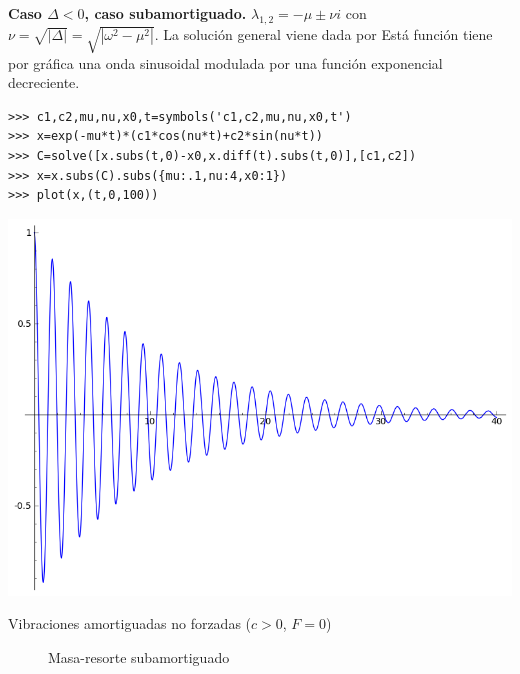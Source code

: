 \noindent\textbf{Caso $\Delta<0$, caso subamortiguado.} $\lambda_{1,2}=-\mu\pm\nu i$ con $\nu=\sqrt{|\Delta|}=\sqrt{|\omega^2-\mu^2|}$.
La solución general viene dada por
Está función tiene por gráfica una onda sinusoidal modulada por una función exponencial
decreciente.

\begin{lstlisting}
>>> c1,c2,mu,nu,x0,t=symbols('c1,c2,mu,nu,x0,t')
>>> x=exp(-mu*t)*(c1*cos(nu*t)+c2*sin(nu*t))
>>> C=solve([x.subs(t,0)-x0,x.diff(t).subs(t,0)],[c1,c2])
>>> x=x.subs(C).subs({mu:.1,nu:4,x0:1})
>>> plot(x,(t,0,100))
\end{lstlisting}
\begin{center}
\includegraphics[scale=.15]{imagenes/subamortiguado.png}
\end{center}

{ Vibraciones amortiguadas no forzadas ($c>0$, $F=0$) }
\begin{figure}[h]
\begin{center}
\vspace{.5cm}
\caption{Masa-resorte subamortiguado}
\end{center}
\end{figure}

